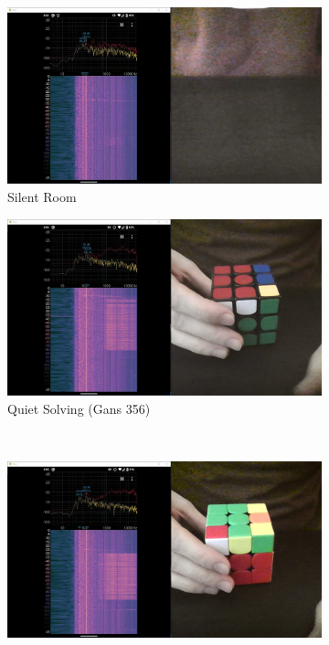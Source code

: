 \begin{figure}
    \centering
    \begin{subfigure}{0.50\textwidth}
        \centering
        \includegraphics[width=.90\linewidth]{Figures/4 Protocol Design/Signal to Noise Ratio/silent_background_noise.jpg}
        \caption{Silent Room}
        \label{fig:signal-to-noise-ratio-silent}
    \end{subfigure}%
    \begin{subfigure}{.50\textwidth}
        \centering
        \includegraphics[width=.90\linewidth]{Figures/4 Protocol Design/Signal to Noise Ratio/356_background_noise.jpg}
        \caption{Quiet Solving (Gans 356)}
        \label{fig:signal-to-noise-ratio-356}
    \end{subfigure}\\%
    \begin{subfigure}{.50\textwidth}
        \centering
        \includegraphics[width=.90\linewidth]{Figures/4 Protocol Design/Signal to Noise Ratio/xs_background_noise.jpg}

\end{subfigure}
\end{figure}
